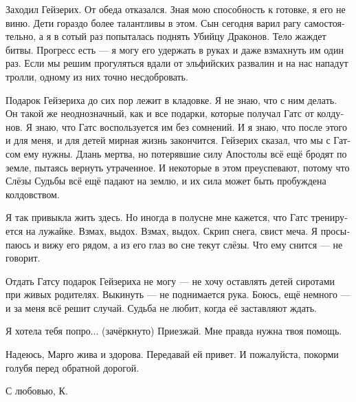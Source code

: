 \documentclass[a4paper,12pt,fleqn]{book}\usepackage{polyglossia}\setdefaultlanguage[babelshorthands=true]{russian}\setotherlanguage{english}\defaultfontfeatures{Ligatures=TeX,Mapping=tex-text}\usepackage{xcolor}\newcommand{\ml}[3]{#2}
\begin{document}
Заходил Гейзерих.
От обеда отказался.
Зная мою способность к готовке, я его не виню.
Дети гораздо более талантливы в этом.
Сын сегодня варил рагу самостоятельно, а я в сотый раз попыталась поднять Убийцу Драконов.
Тело жаждет битвы.
Прогресс есть --- я могу его удержать в руках и даже взмахнуть им один раз.
Если мы решим прогуляться вдали от эльфийских развалин и на нас нападут тролли, одному из них точно несдобровать.

Подарок Гейзериха до сих пор лежит в кладовке.
Я не знаю, что с ним делать.
Он такой же неоднозначный, как и все подарки, которые получал Гатс от колдунов.
Я знаю, что Гатс воспользуется им без сомнений.
И я знаю, что после этого и для меня, и для детей мирная жизнь закончится.
Гейзерих сказал, что мы с Гатсом ему нужны.
Длань мертва, но потерявшие силу Апостолы всё ещё бродят по земле, пытаясь вернуть утраченное.
И некоторые в этом преуспевают, потому что Слёзы Судьбы всё ещё падают на землю, и их сила может быть пробуждена колдовством.

Я так привыкла жить здесь.
Но иногда в полусне мне кажется, что Гатс тренируется на лужайке.
Взмах, выдох. 
Взмах, выдох.
Скрип снега, свист меча.
Я просыпаюсь и вижу его рядом, а из его глаз во сне текут слёзы.
Что ему снится --- не говорит.

Отдать Гатсу подарок Гейзериха не могу --- не хочу оставлять детей сиротами при живых родителях.
Выкинуть --- не поднимается рука.
Боюсь, ещё немного --- и за меня всё решит случай.
Судьба не любит, когда её заставляют ждать.

Я хотела тебя попро... (зачёркнуто)
Приезжай.
Мне правда нужна твоя помощь.

Надеюсь, Марго жива и здорова.
Передавай ей привет.
И пожалуйста, покорми голубя перед обратной дорогой.

С любовью, К.
\end{document}
